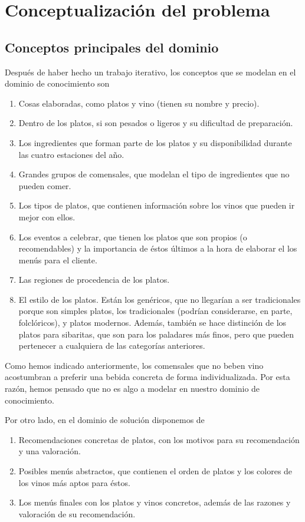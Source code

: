 % 

\section{Conceptualización del problema}
\subsection{Conceptos principales del dominio}
Después de haber hecho un trabajo iterativo, los conceptos que se modelan en el
dominio de conocimiento son
\begin{enumerate}
  \item Cosas elaboradas, como platos y vino (tienen su nombre y precio).
  \item Dentro de los platos, si son pesados o ligeros y su dificultad de
    preparación.
  \item Los ingredientes que forman parte de los platos y su disponibilidad
    durante las cuatro estaciones del año.
  \item Grandes grupos de comensales, que modelan el tipo de ingredientes que
    no pueden comer.
  \item Los tipos de platos, que contienen información sobre los vinos que
    pueden ir mejor con ellos.
  \item Los eventos a celebrar, que tienen los platos que son propios (o
    recomendables) y la importancia de éstos últimos a la hora de elaborar el
    los menús para el cliente.
  \item Las regiones de procedencia de los platos.
  \item El estilo de los platos. Están los genéricos, que no llegarían a ser
    tradicionales porque son simples platos, los tradicionales (podrían
    considerarse, en parte, folclóricos), y platos modernos. Además, también se
    hace distinción de los platos para sibaritas, que son para los paladares
    más finos, pero que pueden pertenecer a cualquiera de las categorías
    anteriores.
\end{enumerate}

Como hemos indicado anteriormente, los comensales que no beben vino acostumbran
a preferir una bebida concreta de forma individualizada. Por esta razón, hemos
pensado que no es algo a modelar en nuestro dominio de conocimiento.

Por otro lado, en el dominio de solución disponemos de
\begin{enumerate}
  \item Recomendaciones concretas de platos, con los motivos para su
    recomendación y una valoración.
  \item Posibles menús abstractos, que contienen el orden de platos y los
    colores de los vinos más aptos para éstos.
  \item Los menús finales con los platos y vinos concretos, además de las
    razones y valoración de su recomendación.
\end{enumerate}

